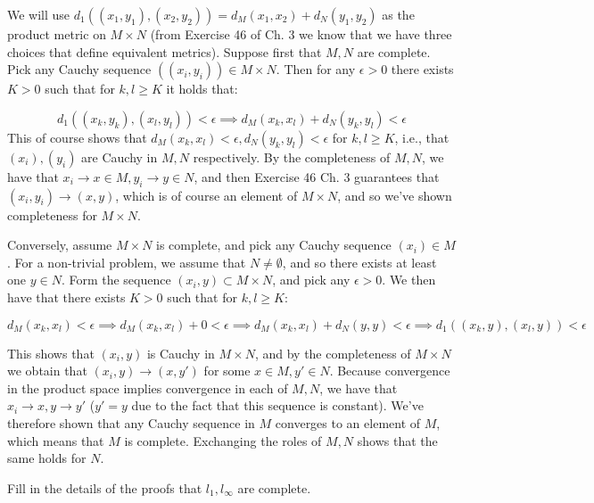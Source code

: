 \begin{solution}
    
    We will use $d_1((x_1, y_1), (x_2, y_2)) = d_M(x_1, x_2) + d_N(y_1, y_2)$ as the product metric on $M \times N$ (from Exercise 46 of Ch. 3 we know that we have three choices that define equivalent metrics).
    Suppose first that $M, N$ are complete.
    Pick any Cauchy sequence $((x_i, y_i)) \in M \times N$.
    Then for any $\epsilon > 0$ there exists $K > 0$ such that for $k, l \geq K$ it holds that:

    \[d_1((x_k, y_k), (x_l, y_l)) < \epsilon \implies d_M(x_k, x_l) + d_N(y_k, y_l) < \epsilon\]
    This of course shows that $d_M(x_k, x_l) < \epsilon, d_N(y_k, y_l) < \epsilon$ for $k, l \geq K$, i.e., that $(x_i), (y_i)$ are Cauchy in $M, N$ respectively.
    By the completeness of $M, N$, we have that $x_i \rightarrow x \in M, y_i \rightarrow y \in N$, and then Exercise 46 Ch. 3 guarantees that $(x_i, y_i) \rightarrow (x, y)$, which is of course an element of $M \times N$, and so we've shown completeness for $M \times N$.

    Conversely, assume $M \times N$ is complete, and pick any Cauchy sequence $(x_i) \in M$.
    For a non-trivial problem, we assume that $N \neq \emptyset$, and so there exists at least one $y \in N$.
    Form the sequence $(x_i, y) \subset M \times N$, and pick any $\epsilon > 0$.
    We then have that there exists $K > 0$ such that for $k, l \geq K$: 

    \[ d_M(x_k, x_l) < \epsilon \implies d_M(x_k, x_l) + 0 < \epsilon \implies d_M(x_k, x_l) + d_N(y, y) < \epsilon \implies d_1((x_k, y), (x_l, y)) < \epsilon\]

    This shows that $(x_i, y)$ is Cauchy in $M \times N$, and by the completeness of $M \times N$ we obtain that $(x_i, y) \rightarrow (x, y')$ for some $x \in M, y' \in N$.
    Because convergence in the product space implies convergence in each of $M, N$, we have that $x_i \rightarrow x, y \rightarrow y'$ ($y' = y$ due to the fact that this sequence is constant).
    We've therefore shown that any Cauchy sequence in $M$ converges to an element of $M$, which means that $M$ is complete.
    Exchanging the roles of $M, N$ shows that the same holds for $N$.

\end{solution}

\begin{exercise}{18}
    Fill in the details of the proofs that $l_1, l_{\infty}$ are complete.
\end{exercise}

